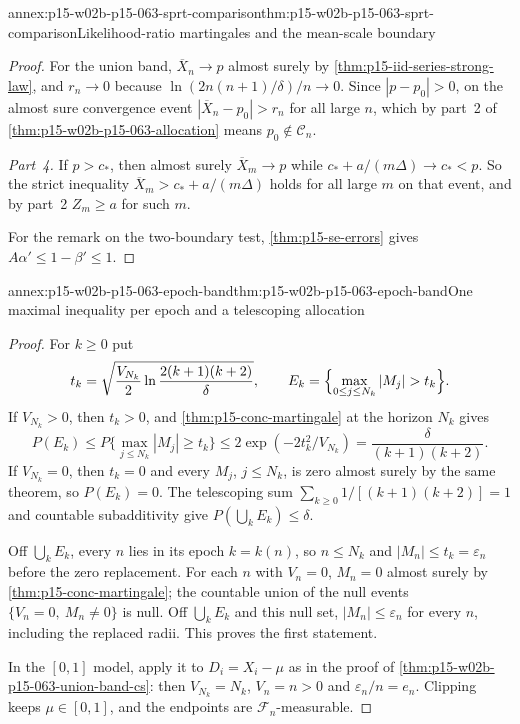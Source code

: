 \begin{annexitem}{annex:p15-w02b-p15-063-sprt-comparison}{thm:p15-w02b-p15-063-sprt-comparison}{Likelihood-ratio martingales and the mean-scale boundary}
\begin{proof}
For the union band, \(\overline X_n\to p\) almost surely by
\cref{thm:p15-iid-series-strong-law}, and \(r_n\to0\) because
\(\ln(2n(n+1)/\delta)/n\to0\). Since \(|p-p_0|>0\), on the almost sure
convergence event \(|\overline X_n-p_0|>r_n\) for all large \(n\), which
by part~2 of \cref{thm:p15-w02b-p15-063-allocation} means
\(p_0\notin\mathcal C_n\).

\emph{Part~4.} If \(p>c_*\), then almost surely
\(\overline X_m\to p\) while \(c_*+a/(m\Delta)\to c_*<p\). So the strict
inequality \(\overline X_m>c_*+a/(m\Delta)\) holds for all large \(m\)
on that event, and by part~2 \(Z_m\geq a\) for such \(m\).

For the remark on the two-boundary test, \cref{thm:p15-se-errors} gives
\(A\alpha'\leq1-\beta'\leq1\).
\end{proof}
\end{annexitem}

\begin{annexitem}{annex:p15-w02b-p15-063-epoch-band}{thm:p15-w02b-p15-063-epoch-band}{One maximal inequality per epoch and a telescoping allocation}
\begin{proof}
For \(k\geq0\) put
\[
 t_k=\sqrt{\frac{V_{N_k}}2\ln\frac{2(k+1)(k+2)}\delta},\qquad
 E_k=\Bigl\{\max_{0\leq j\leq N_k}|M_j|>t_k\Bigr\}.
\] If \(V_{N_k}>0\), then
\(t_k>0\), and \cref{thm:p15-conc-martingale} at the horizon \(N_k\) gives
\[
 P(E_k)\leq P\{\max_{j\leq N_k}|M_j|\geq t_k\}
   \leq2\exp(-2t_k^2/V_{N_k})=\frac{\delta}{(k+1)(k+2)}.
\]
If \(V_{N_k}=0\), then \(t_k=0\) and every \(M_j\), \(j\leq N_k\), is zero
almost surely by the same theorem, so \(P(E_k)=0\). The telescoping sum
\(\sum_{k\geq0}1/[(k+1)(k+2)]=1\) and countable subadditivity give
\(P(\bigcup_kE_k)\leq\delta\).

Off \(\bigcup_kE_k\), every \(n\) lies in its epoch \(k=k(n)\), so
\(n\leq N_k\) and \(|M_n|\leq t_k=\varepsilon_n\) before the zero
replacement. For each \(n\) with \(V_n=0\), \(M_n=0\) almost surely by
\cref{thm:p15-conc-martingale}; the countable union of the null events
\(\{V_n=0,\ M_n\ne0\}\) is null. Off \(\bigcup_kE_k\) and this null set,
\(|M_n|\leq\varepsilon_n\) for every \(n\), including the replaced radii.
This proves the first statement.

In the \([0,1]\) model, apply it to \(D_i=X_i-\mu\) as in the proof of
\cref{thm:p15-w02b-p15-063-union-band-cs}: then \(V_{N_k}=N_k\), \(V_n=n>0\)
and \(\varepsilon_n/n=e_n\). Clipping keeps \(\mu\in[0,1]\), and the
endpoints are \(\mathcal F_n\)-measurable.
\end{proof}
\end{annexitem}

